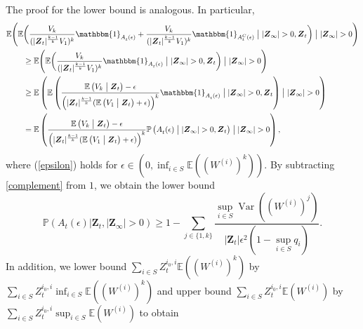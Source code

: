 \documentclass[preprint,3p,12pt]{elsarticle}
\theoremstyle{definition}
\newcommand{\Var}{\operatorname{Var}}
\newcommand{\A}[1][]{A_t^{#1}(\epsilon)}
\newcommand{\z}[1][i_0, i]{Z_t^{#1}}
\newcommand{\V}[1]{V_{#1}}
\begin{document}
The proof for the lower bound is analogous. In particular,
\begin{align}
  \mathbb{E}\Bigg(\mathbb{E}&\bigg(\frac{\V{k} }
    {(|\boldsymbol{Z}_t|^{\frac{k-1}{k}}\V{1})^k} \mathbbm{1}_{\A} + %
    \frac{\V{k}}
    {(|\boldsymbol{Z}_t|^{\frac{k-1}{k}}\V{1})^k} \mathbbm{1}_{\A[C]}
    \bigm| |\boldsymbol{Z}_{\infty}| > 0,\boldsymbol{Z}_t  \bigg)\bigm| |\boldsymbol{Z}_{\infty}| > 0\Bigg) \notag\\
 &\ge \mathbb{E}\Bigg(\mathbb{E}\bigg(\frac{\V{k}}
    {(|\boldsymbol{Z}_t|^{\frac{k-1}{k}}\V{1})^k} \mathbbm{1}_{\A} \bigm| |\boldsymbol{Z}_{\infty}| > 0,\boldsymbol{Z}_t  \bigg)\bigm| |\boldsymbol{Z}_{\infty}| > 0\Bigg) \notag\\
    &\ge \mathbb{E}\left(\mathbb{E}\left(\frac{\mathbb{E}\left(\V{k}\bigm|  \boldsymbol{Z}_t\right)-\epsilon}
    {\left(|\boldsymbol{Z}_t|^{\frac{k-1}{k}}(\mathbb{E}\left(\V{1}\bigm|  \boldsymbol{Z}_t\right)+\epsilon)\right)^k}\mathbbm{1}_{\A}\bigm| |\boldsymbol{Z}_{\infty}| > 0,\boldsymbol{Z}_t  \right)\bigm| |\boldsymbol{Z}_{\infty}| > 0\right) \label{epsilon}\\
    &=\mathbb{E}\left(\frac{\mathbb{E}\left(\V{k}\bigm|  \boldsymbol{Z}_t\right)-\epsilon}
    {\left(|\boldsymbol{Z}_t|^{\frac{k-1}{k}}(\mathbb{E}\left(\V{1}\bigm|  \boldsymbol{Z}_t\right)+\epsilon)\right)^k}\mathbb{P}\left(\A\bigm| |\boldsymbol{Z}_{\infty}| > 0,\boldsymbol{Z}_t  \right)\bigm| |\boldsymbol{Z}_{\infty}| > 0\right), \notag
    \end{align}
where (\ref{epsilon}) holds for $\epsilon \in (0, \inf_{i \in S} \mathbb{E}((W^{(i)})^k))$.
    By subtracting \eqref{complement} from $1$, we obtain the lower bound %
    \begin{equation}
        \mathbb{P}(\A|\boldsymbol{Z}_t, |\boldsymbol{Z}_{\infty}| > 0) \ge 1 -  \sum_{j \in \{1,k\}}\frac{\sup_{i \in S}{\Var((W^{(i)})^j)}}{|\boldsymbol{Z}_t| \epsilon^2(1 - \sup_{i \in S}q_i)}.
    \end{equation}
    In addition, we lower bound $\sum_{i \in S}\z \mathbb{E}((W^{(i)})^k)$ by $\sum_{i \in S}\z \inf_{i \in S}\mathbb{E}((W^{(i)})^k)$ and upper bound $\sum_{i \in S}\z \mathbb{E}(W^{(i)})$ by $\sum_{i \in S}\z \sup_{i \in S}\mathbb{E}(W^{(i)})$ to obtain
\end{document}
